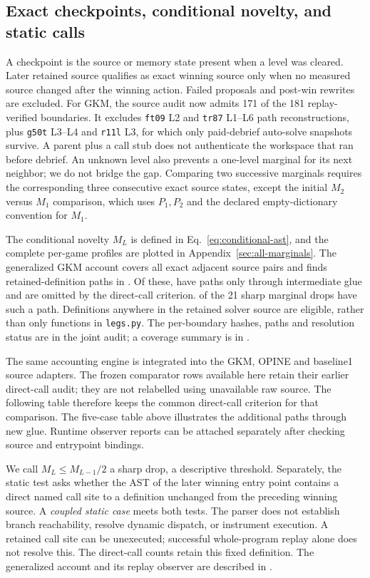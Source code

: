 \documentclass[11pt]{article}
\theoremstyle{definition}
\theoremstyle{remark}
\begin{document}
\subsection{Exact checkpoints, conditional novelty, and static calls}
\label{sec:source-audit}
A checkpoint is the source or memory state present when a level was cleared. Later
retained source qualifies as exact winning source only when no measured source changed
after the winning action. Failed proposals and post-win rewrites are excluded.
For GKM, the source audit now admits 171 of the 181 replay-verified boundaries.
It excludes \texttt{ft09} L2 and \texttt{tr87} L1--L6 path reconstructions, plus
\texttt{g50t} L3--L4 and \texttt{r11l} L3, for which only paid-debrief auto-solve
snapshots survive. A parent plus a call stub does not authenticate the workspace that
ran before debrief. An unknown level also prevents a one-level marginal for its next
neighbor; we do not bridge the gap. Comparing two successive marginals requires the
corresponding three consecutive exact source states, except the initial $M_2$
versus $M_1$ comparison, which uses $P_1,P_2$ and the declared empty-dictionary
convention for $M_1$.

The conditional novelty $M_L$ is defined in Eq.~\eqref{eq:conditional-ast}, and
the complete per-game profiles are plotted in Appendix~\ref{sec:all-marginals}.
The generalized GKM account covers all \GKMGeneralPairs{} exact adjacent source
pairs and finds retained-definition paths in \GKMGeneralPaths{}. Of these,
\GKMAdditionalGluePaths{} have paths only through intermediate glue and are omitted
by the direct-call criterion. \GKMGeneralSharpPaths{} of the 21 sharp marginal
drops have such a path. Definitions anywhere in the retained solver source are
eligible, rather than only functions in \texttt{legs.py}. The per-boundary hashes,
paths and resolution status are in the joint audit; a coverage summary is in
.

The same accounting engine is integrated into the GKM, OPINE and baseline1 source
adapters. The frozen comparator rows available here retain their earlier direct-call
audit; they are not relabelled using unavailable raw source. The following table
therefore keeps the common direct-call criterion for that comparison. The five-case
table above illustrates the additional paths through new glue. Runtime observer
reports can be attached separately after checking source and entrypoint bindings.

We call $M_L\le M_{L-1}/2$ a sharp drop, a descriptive threshold. Separately, the
static test asks whether the AST of the later winning entry point contains a direct
named call site to a definition unchanged from the preceding winning source.
A \emph{coupled static case} meets both tests. The parser does not establish branch
reachability, resolve dynamic dispatch, or instrument execution. A retained call site
can be unexecuted; successful whole-program replay alone does not resolve this.
The direct-call counts retain this fixed definition. The generalized account and
its replay observer are described in .
\end{document}
